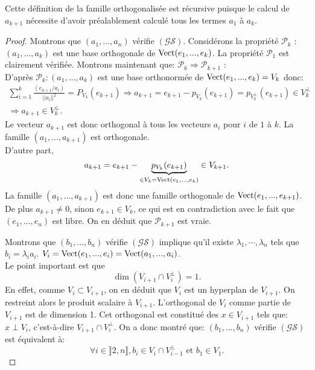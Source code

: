 \begin{rem}
Cette définition de la famille orthogonalisée est récursive puisque le calcul de $a_{k+1}$ nécessite d'avoir préalablement calculé tous les termes $a_1$ à $a_k$.
\end{rem}
\clearpage
\begin{proof}
Montrons que $(a_1, ..., a_n)$ vérifie $(\mathcal{GS})$. Considérons la propriété $\mathcal{P}_{k}$ : $(a_1, ..., a_k)$ est une base orthogonale de $\mathop{\mathrm{Vect}}(e_1, ..., e_k)$.\newline
La propriété $\mathcal{P}_{1}$ est clairement vérifiée. Montrons maintenant que: $\mathcal{P}_{k} \Rightarrow \mathcal{P}_{k+1}$ :\\
D'après $\mathcal{P}_{k} : (a_1, ..., a_k)$ est une base orthonormée de $\mathop{\mathrm{Vect}}(e_1, ..., e_k) = V_k$ donc:
\begin{multline*}
 \sum_{i=1}^{k} \frac{ (e_{k+1}/a_i) }{ ||a_i||^2 } = P_{V_k} (e_{k+1})  
 \Rightarrow 
a_{k+1} = e_{k+1} - p_{V_{k}}(e_{k+1}) = p_{V_{k}^{\perp}}( e_{k+1} ) \in V_{k}^{\perp} \\
\Rightarrow
a_{k+1} \in V_{k}^{\perp} .
\end{multline*}
Le vecteur $a_{k+1}$ est donc orthogonal à tous les vecteurs $a_i$ pour $i$ de $1$ à $k$. La famille $(a_1, ..., a_{k+1})$ est orthogonale.\\
D'autre part, 
\begin{displaymath}
a_{k+1} = e_{k+1} - \underset{\in V_k = \mathop{\mathrm{Vect}}(e_1, ..., e_k)}{\underbrace{p_{V_{k}}(e_{k+1})}} \in V_{k+1} .
\end{displaymath}
La famille $(a_1, ..., a_{k+1})$ est donc une famille orthogonale de $\mathop{\mathrm{Vect}}(e_1, ..., e_{k+1})$. De plus $a_{k+1} \neq 0$, sinon $e_{k+1} \in V_{k}$, ce qui est en contradiction avec le fait que $(e_1, ..., e_n)$ est libre. On en déduit que $\mathcal{P}_{k+1}$ est vraie.

Montrons que $(b_1, ..., b_n)$ vérifie $(\mathcal{GS})$ implique qu'il existe $\lambda_1,\cdots, \lambda_n$ tels que $b_i = \lambda_i a_i$. $V_i = \mathop{\mathrm{Vect}}(e_1, ..., e_i) = \mathop{\mathrm{Vect}}(a_1, ..., a_i)$.\\
Le point important est que
\begin{displaymath}
\dim \left( V_{i+1} \cap V_{i}^{\perp}\right) = 1 .
\end{displaymath}
En effet, comme $V_i \subset V_{i+1}$, on en déduit que $V_{i}$ est un hyperplan de $V_{i+1}$. On restreint alors le produit scalaire à $V_{i+1}$. L'orthogonal de $V_i$ comme partie de $V_{i+1}$ est de dimension 1. Cet orthogonal est constitué des $x \in V_{i+1}$ tels que: $x \perp V_i$, c'est-à-dire $V_{i+1} \cap V_{i}^{\perp}$.
On a donc montré que: $(b_1, ..., b_n)$ vérifie $(\mathcal{GS})$ est équivalent à:
\begin{displaymath}
\forall i \in \rrbracket 2, n \rrbracket, b_i \in V_{i} \cap V_{i-1}^{\perp} \text{ et } b_1 \in V_1.
\end{displaymath}
\end{proof}
